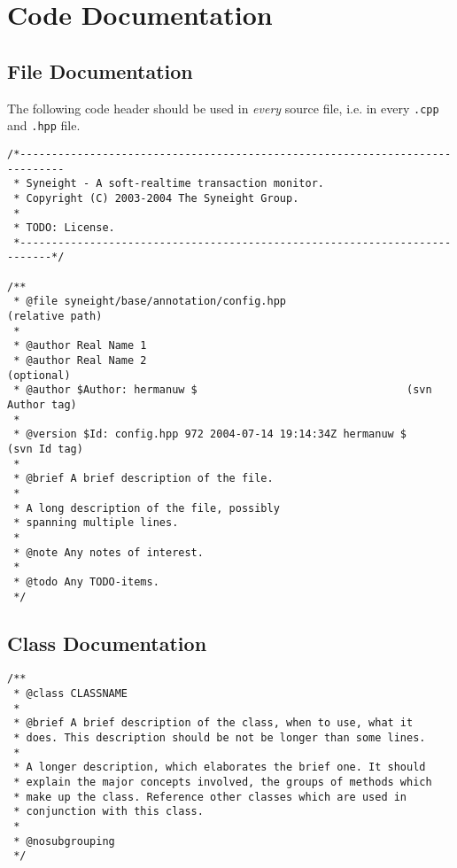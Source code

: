%

\chapter{Code Documentation}
\label{cha:code-documentation}

\section{File Documentation}
\label{sec:file-documentation}

The following code header should be used in \emph{every} source file, i.e. in
every {\tt *.cpp} and {\tt *.hpp} file.

\begin{verbatim}
/*-----------------------------------------------------------------------------
 * Syneight - A soft-realtime transaction monitor.
 * Copyright (C) 2003-2004 The Syneight Group.
 *
 * TODO: License.
 *---------------------------------------------------------------------------*/

/**
 * @file syneight/base/annotation/config.hpp                     (relative path)
 *
 * @author Real Name 1
 * @author Real Name 2                                               (optional)
 * @author $Author: hermanuw $                                 (svn Author tag)
 *
 * @version $Id: config.hpp 972 2004-07-14 19:14:34Z hermanuw $    (svn Id tag)
 *
 * @brief A brief description of the file.
 *
 * A long description of the file, possibly
 * spanning multiple lines.
 *
 * @note Any notes of interest.
 *
 * @todo Any TODO-items.
 */
\end{verbatim}



\section{Class Documentation}
\label{sec:class-documentation}

\begin{verbatim}
/**
 * @class CLASSNAME
 *
 * @brief A brief description of the class, when to use, what it
 * does. This description should be not be longer than some lines.
 *
 * A longer description, which elaborates the brief one. It should 
 * explain the major concepts involved, the groups of methods which
 * make up the class. Reference other classes which are used in 
 * conjunction with this class.
 *
 * @nosubgrouping
 */
\end{verbatim}


